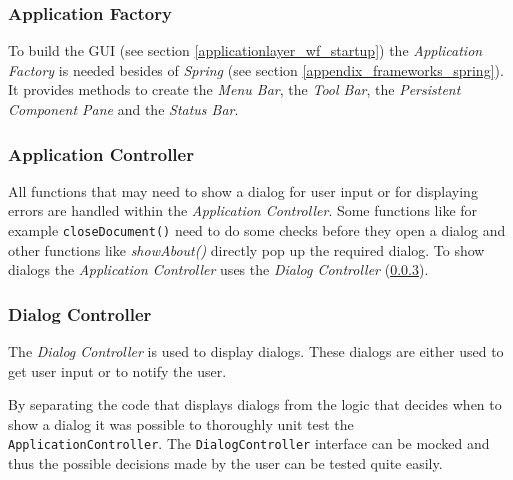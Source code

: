 \subsubsection{Application Factory}
\label{applicationlayer_applicationfactory}

To build the GUI (see section \ref{applicationlayer_wf_startup}) the \textit{Application Factory} is needed besides of \textit{Spring} (see section \ref{appendix_frameworks_spring}). It provides methods to create the \textit{Menu Bar}, the \textit{Tool Bar}, the \textit{Persistent Component Pane} and the \textit{Status Bar}.

\subsubsection{Application Controller}
All functions that may need to show a dialog for user input or for displaying errors are handled within the \textit{Application Controller}. Some functions like for example \texttt{closeDocument()} need to do some checks before they open a dialog and other functions like \textit{showAbout()} directly pop up the required dialog. To show dialogs the \textit{Application Controller} uses the \textit{Dialog Controller} (\ref{applicationlayer_dialogcontroller}).

\subsubsection{Dialog Controller}
\label{applicationlayer_dialogcontroller}
The \textit{Dialog Controller} is used to display dialogs. These dialogs are either used to get user input or to notify the user. 


By separating the code that displays dialogs from the logic that decides when
to show a dialog it was possible to thoroughly unit test the \texttt{Application\-Controller}. The \texttt{Dialog\-Controller} interface can be mocked and thus the possible decisions made by the user can be tested quite easily.





